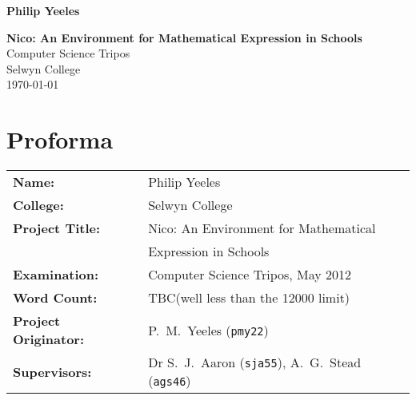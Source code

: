 \documentclass[12pt,twoside,notitlepage]{report}
\begin{document}





\pagestyle{empty}

\hfill{\LARGE \bf \sffamily Philip Yeeles}

\vspace*{60mm}
\begin{center}
\Huge
{\bf \bigsf Nico: An Environment for Mathematical Expression in Schools} \\
\vspace*{5mm}
{\sffamily Computer Science Tripos} \\
\vspace*{5mm}
{\sffamily Selwyn College} \\
\vspace*{5mm}
{\sffamily \today}  %
\end{center}

\cleardoublepage


\setcounter{page}{1}
\pagestyle{plain}

\chapter*{Proforma}

{\large
\begin{tabular}{ll}
\bf Name:               & Philip Yeeles                                                   \\
\bf College:            & Selwyn College                                                  \\
\bf Project Title:      & Nico: An Environment for Mathematical\\
                        & Expression in Schools \\
\bf Examination:        & Computer Science Tripos, May 2012                               \\
\bf Word Count:         & TBC\footnotemark[1]
(well less than the 12000 limit) \\
\bf Project Originator: & P.~M.~Yeeles (\verb¬pmy22¬)                                    \\
\bf Supervisors:        & Dr S.~J.~Aaron (\verb¬sja55¬), A.~G.~Stead (\verb¬ags46¬)     \\
\end{tabular}
}
\end{document}
